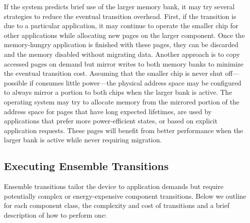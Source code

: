 If the system predicts brief use of the larger memory bank, it may try
several strategies to reduce the eventual transition overhead. First, if the
transition is due to a particular application, it may continue to operate the
smaller chip for other applications while allocating new pages on the larger
component. Once the memory-hungry application is finished with these pages,
they can be discarded and the memory disabled without migrating data. Another
approach is to copy accessed pages on demand but mirror writes to both memory
banks to minimize the eventual transition cost. Assuming that the smaller
chip is never shut off---possible if consumes little power---the physical
address space may be configured to always mirror a portion to both chips when
the larger bank is active. The operating system may try to allocate memory
from the mirrored portion of the address space for pages that have long
expected lifetimes, are used by applications that prefer more power-efficient
states, or based on explicit application requests. These pages will benefit
from better performance when the larger bank is active while never requiring
migration.

\subsection{Executing Ensemble Transitions}
\label{subsec-execute}

Ensemble transitions tailor the device to application demands but require
potentially complex or energy-expensive component transitions. Below we
outline for each component class, the complexity and cost of transitions and
a brief description of how to perform one:

